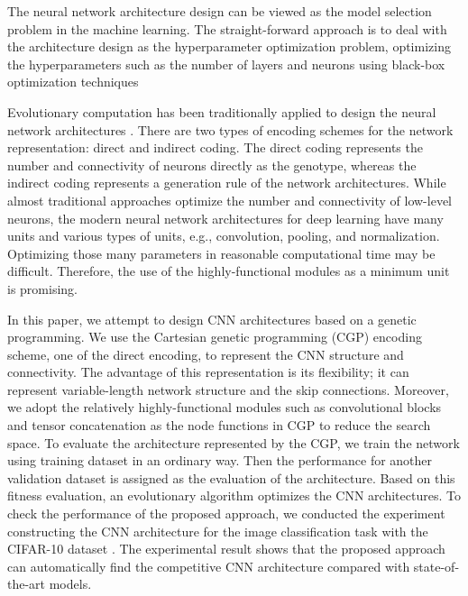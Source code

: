 The neural network architecture design can be viewed as the model selection problem in the machine learning. The straight-forward approach is to deal with the architecture design as the hyperparameter optimization problem, optimizing the hyperparameters such as the number of layers and neurons using black-box optimization techniques 

Evolutionary computation has been traditionally applied to design the neural network architectures .
There are two types of encoding schemes for the network representation: direct and indirect coding.
The direct coding represents the number and connectivity of neurons directly as the genotype, whereas the indirect coding represents a generation rule of the network architectures.
While almost traditional approaches optimize the number and connectivity of low-level neurons, the modern neural network architectures for deep learning have many units and various types of units, e.g., convolution, pooling, and normalization.
Optimizing those many parameters in reasonable computational time may be difficult.
Therefore, the use of the highly-functional modules as a minimum unit is promising.

In this paper, we attempt to design CNN architectures based on a genetic programming.
We use the Cartesian genetic programming (CGP) \cite{miller_cartesian_2000,harding_evolution_2008} encoding scheme, one of the direct encoding, to represent the CNN structure and connectivity.
The advantage of this representation is its flexibility; it can represent variable-length network structure and the skip connections.
Moreover, we adopt the relatively highly-functional modules such as convolutional blocks and tensor concatenation as the node functions in CGP to reduce the search space.
To evaluate the architecture represented by the CGP, we train the network using training dataset in an ordinary way. Then the performance for another validation dataset is assigned as the evaluation of the architecture. Based on this fitness evaluation, an evolutionary algorithm optimizes the CNN architectures.
 To check the performance of the proposed approach, we conducted the experiment constructing the CNN architecture for the image classification task with the CIFAR-10 dataset \cite{krizhevsky_learning_2009}. The experimental result shows that the proposed approach can automatically find the competitive CNN architecture compared with state-of-the-art models.


